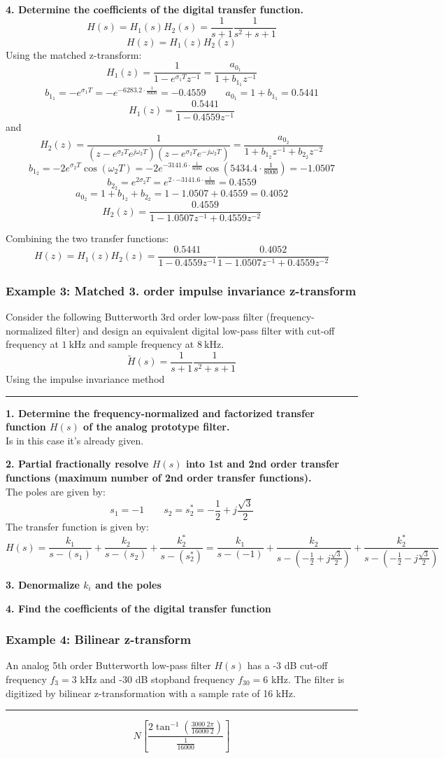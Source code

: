\textbf{4. Determine the coefficients of the digital transfer function.}
$$H(s)=H_1(s)H_2(s)=\frac{1}{s+1}\frac{1}{s^{2}+s+1}$$
$$H(z)=H_1(z)H_2(z)$$
Using the matched z-transform:
$$H_1(z)=\frac{1}{1-e^{\sigma_1 T}z^{-1}}=\frac{a_{0_1}}{1+b_{1_1}z^{-1}}$$
$$b_{1_1}=-e^{\sigma_1 T}=-e^{-6283.2\cdot\frac{1}{8000}}=-0.4559\qquad a_{0_1}=1+b_{1_1}=0.5441$$
$$H_1(z)=\frac{0.5441}{1-0.4559z^{-1}}$$
and
$$H_2(z)={\frac{1}{(z-e^{\sigma_{2}T}e^{j\omega_{2}T})(z-e^{\sigma_{2}T}e^{-j\omega_{2}T})}}=\frac{a_{0_2}}{1+b_{1_2}z^{-1}+b_{2_2}z^{-2}}$$
$$b_{1_2}=-2e^{\sigma_2 T}\cos(\omega_2 T)=-2e^{-3141.6\cdot\frac{1}{8000}}\cos(5434.4\cdot\tfrac{1}{8000})=-1.0507$$
$$b_{2_2}=e^{2\sigma_2 T}=e^{2\cdot -3141.6\cdot\frac{1}{8000}}=0.4559$$
$$a_{0_2}=1+b_{1_2}+b_{2_2}=1-1.0507+0.4559=0.4052$$
$$H_2(z)=\frac{0.4559}{1-1.0507z^{-1}+0.4559z^{-2}}$$

Combining the two transfer functions:
$$H(z)=H_1(z)H_2(z)=\frac{0.5441}{1-0.4559z^{-1}}\frac{0.4052}{1-1.0507z^{-1}+0.4559z^{-2}}$$

\subsubsection{Example 3: Matched 3. order impulse invariance z-transform}
Consider the following Butterworth 3rd order low-pass filter (frequency-normalized filter) 
and design an equivalent digital low-pass filter with cut-off frequency at $\SI{1}{\kilo\hertz}$ and sample frequency at $\SI{8}{\kilo\hertz}$. 
$${\tilde{H}}(s)=\frac{1}{s+1}\frac{1}{s^{2}+s+1}$$
Using the impulse invariance method

\rule{\textwidth}{0.5pt}

\textbf{1. Determine the frequency-normalized and factorized transfer function $H(s)$ of the analog prototype filter.}\\
Is in this case it's already given.

\textbf{2. Partial fractionally resolve $H(s)$ into 1st and 2nd order transfer functions (maximum number of 2nd order transfer functions).}\\
The poles are given by:
$$s_1=-1 \qquad s_2=s_2^*=-\frac{1}{2}+j\frac{\sqrt{3}}{2}$$
The transfer function is given by:
$$H(s)=\frac{k_1}{s-(s_1)}+\frac{k_2}{s-(s_2)}+\frac{k_2^*}{s-(s_2^*)}=\frac{k_1}{s-(-1)}+\frac{k_2}{s-(-\frac{1}{2}+j\frac{\sqrt{3}}{2})}+\frac{k_2^*}{s-(-\frac{1}{2}-j\frac{\sqrt{3}}{2})}$$


\textbf{3. Denormalize $k_i$ and the poles}

\textbf{4. Find the coefficients of the digital transfer function}
\subsubsection{Example 4: Bilinear z-transform}
An analog 5th order Butterworth low-pass filter $H(s)$ has a -3 dB cut-off frequency $f_3= 3$ kHz and -30 dB stopband frequency $f_{30}= 6$ kHz. 
The filter is digitized by bilinear z-transformation with a sample rate of 16 kHz. 

\rule{\textwidth}{0.5pt}

$$N\left[\frac{2 \tan ^{-1}\left(\frac{3000\ 2 \pi }{16000\ 2}\right)}{\frac{1}{16000}}\right]$$

